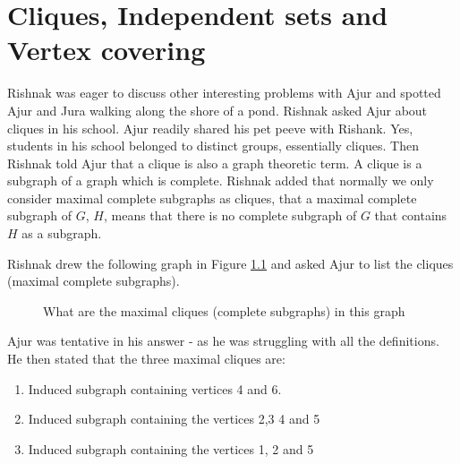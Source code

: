 \chapter{Cliques, Independent sets and Vertex covering }
Rishnak was eager to discuss other interesting problems with Ajur and  spotted Ajur and Jura walking along the shore of a pond. Rishnak asked Ajur about cliques in his school. Ajur readily shared his pet peeve with Rishank. Yes, students in his school belonged to distinct groups, essentially cliques. Then Rishnak told Ajur that a clique is also a graph theoretic term. A clique is a subgraph of a graph which is complete. Rishnak added that normally we only consider maximal complete subgraphs as cliques, that a maximal complete subgraph of $G$, $H$, means that there is no complete subgraph of $G$ that contains $H$ as a subgraph.

Rishnak drew the following graph in Figure \ref{13g1} and asked Ajur to list the cliques (maximal complete subgraphs).
\begin{figure}
\begin{center}
\caption{ What are the maximal cliques (complete subgraphs) in this graph}\label{13g1}
\end{center}
\end{figure}

Ajur was tentative in his answer - as he was struggling with all the definitions. He then stated that the three maximal cliques are: 
\begin{enumerate}
    \item Induced subgraph containing vertices 4 and 6.
    \item Induced subgraph containing the vertices 2,3 4 and 5
    \item Induced subgraph containing the vertices 1, 2 and 5
\end{enumerate} 

